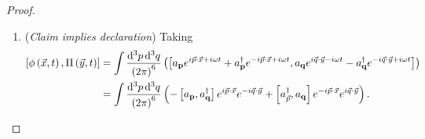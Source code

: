 \begin{proof}
    \begin{enumerate}[label=\arabic*)]
        \item (\textit{Claim implies declaration}) Taking
            \begin{align}
                \left[ \phi \left( \vec{x},t \right) , \Pi \left( \vec{y},t \right)  \right] &= \int \frac{\dd{^3p} \dd{^3q}}{\left( 2\pi \right)^{6}} \left(  \left[ a_{\vb{p}} e^{i \vec{p} \cdot \vec{x} + i \omega t} + a^{\dag}_{\vb{p}} e^{-i \vec{p} \cdot \vec{x} + i \omega t}, a_{\vb{q}} e^{i \vec{q} \cdot \vec{y} - i \omega t} - a^{\dag}_{\vb{q}} e^{-i \vec{q} \cdot \vec{y} + i \omega t}  \right]  \right) \\
&= \int \frac{\dd{^3p} \dd{^3q}}{\left( 2\pi \right)^{6}} \left( - \left[ a_{\vb{p}}, a^{\dag}_{\vb{q}} \right] e^{i \vec{p} \cdot \vec{x}} e^{-i \vec{q} \cdot \vec{y}} + \left[ a^{\dag}_{\vec{p}}, a_{\vb{q}} \right] e^{-i \vec{p} \cdot \vec{x}} e^{i \vec{q} \cdot \vec{y}}  \right) 
            .\end{align}
    \end{enumerate}
\end{proof}


